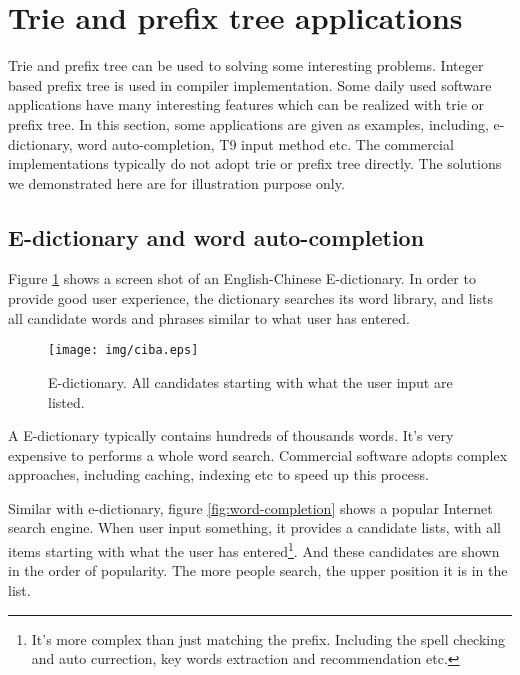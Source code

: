 \documentclass{article}
\begin{document}
\section{Trie and prefix tree applications}

Trie and prefix tree can be used to solving some interesting problems.
Integer based prefix tree is used in compiler implementation. Some daily
used software applications have many interesting features which can be
realized with trie or prefix tree. In this section, some applications are
given as examples, including, e-dictionary, word auto-completion, T9
input method etc.
The commercial implementations typically do not adopt trie or prefix tree
directly. The solutions we demonstrated here are for illustration purpose
only.

\subsection{E-dictionary and word auto-completion}
Figure \ref{fig:e-dict} shows a screen shot of an English-Chinese E-dictionary.
In order to provide good user experience,
the dictionary searches its word library, and lists all candidate words and
phrases similar to what user has entered.

\begin{figure}[htbp]
  \centering
  \texttt{[image: img/ciba.eps]}
  \caption{E-dictionary. All candidates starting with what the user input are listed.}
  \label{fig:e-dict}
\end{figure}

A E-dictionary typically contains hundreds of thousands words. It's very expensive
to performs a whole word search. Commercial software adopts complex approaches, including
caching, indexing etc to speed up this process.

Similar with e-dictionary, figure \ref{fig:word-completion} shows a popular
Internet search engine. When user input something, it provides a candidate
lists, with all items starting with what the user has entered\footnote{It's more complex than just matching the prefix. Including the spell checking and auto currection, key words extraction and recommendation etc.}. And these candidates
are shown in the order of popularity. The more people search, the
upper position it is in the list.
\end{document}
